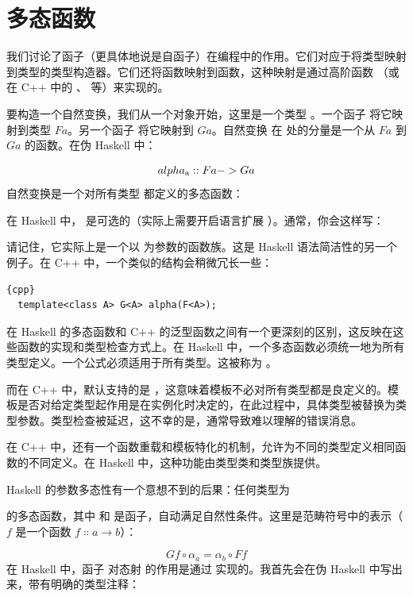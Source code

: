\section{多态函数}

我们讨论了函子（更具体地说是自函子）在编程中的作用。它们对应于将类型映射到类型的类型构造器。它们还将函数映射到函数，这种映射是通过高阶函数 （或在 C++ 中的 、 等）来实现的。

要构造一个自然变换，我们从一个对象开始，这里是一个类型 。一个函子  将它映射到类型 $F a$。另一个函子  将它映射到 $G a$。自然变换  在  处的分量是一个从 $F a$ 到 $G a$ 的函数。在伪 Haskell 中：

\begin{align}
  alpha\textsubscript{a} :: F a -> G a
\end{align}
自然变换是一个对所有类型  都定义的多态函数：

在 Haskell 中， 是可选的（实际上需要开启语言扩展 ）。通常，你会这样写：

请记住，它实际上是一个以  为参数的函数族。这是 Haskell 语法简洁性的另一个例子。在 C++ 中，一个类似的结构会稍微冗长一些：

\begin{lstlisting}{cpp}
  template<class A> G<A> alpha(F<A>);
\end{lstlisting}
在 Haskell 的多态函数和 C++ 的泛型函数之间有一个更深刻的区别，这反映在这些函数的实现和类型检查方式上。在 Haskell 中，一个多态函数必须统一地为所有类型定义。一个公式必须适用于所有类型。这被称为 。

而在 C++ 中，默认支持的是 ，这意味着模板不必对所有类型都是良定义的。模板是否对给定类型起作用是在实例化时决定的，在此过程中，具体类型被替换为类型参数。类型检查被延迟，这不幸的是，通常导致难以理解的错误消息。

在 C++ 中，还有一个函数重载和模板特化的机制，允许为不同的类型定义相同函数的不同定义。在 Haskell 中，这种功能由类型类和类型族提供。

Haskell 的参数多态性有一个意想不到的后果：任何类型为

的多态函数，其中  和  是函子，自动满足自然性条件。这里是范畴符号中的表示（$f$ 是一个函数 $f \Colon a \to b$）：

\[G f \circ \alpha_a = \alpha_b \circ F f\]
在 Haskell 中，函子  对态射  的作用是通过  实现的。我首先会在伪 Haskell 中写出来，带有明确的类型注释：

